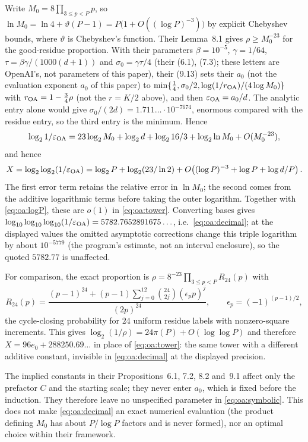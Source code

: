 Write $M_0=8\prod_{3\le p<P}p$, so
$\ln M_0=\ln4+\vartheta(P-1)=P\bigl(1+O((\log P)^{-3})\bigr)$ by
explicit Chebyshev bounds, where $\vartheta$ is Chebyshev's
function. Their Lemma~8.1 gives $\rho\ge M_0^{-23}$ for the
good-residue proportion. With their parameters
$\beta=10^{-5}$, $\gamma=1/64$,
$\tau=\beta\gamma/(1000(d+1))$ and $\sigma_0=\gamma\tau/4$
(their (6.1), (7.3); these letters are OpenAI's, not parameters
of this paper), their (9.13) sets their
$a_0$ (not the evaluation exponent $a_0$ of this paper) to
$\min\{\tfrac14,\sigma_0/2,\log(1/r_{\rm OA})/(4\log M_0)\}$
with $r_{\rm OA}=1-\tfrac34\rho$ (not the $r=K/2$ above), and
then $\varepsilon_{\mathrm{OA}}=a_0/d$. The
analytic entry alone would give
$\sigma_0/(2d)=1.711\ldots\cdot10^{-7674}$, enormous compared with
the residue entry, so the third entry is the minimum. Hence
\[
  \log_21/\varepsilon_{\mathrm{OA}}
   =23\log_2M_0+\log_2d+\log_216/3+\log_2\ln M_0
     +O(M_0^{-23}),
\]
and hence
\[
 X=\log_2\log_2(1/\varepsilon_{\mathrm{OA}})
 =\log_2P+\log_2(23/\ln2)
   +O\!\left((\log P)^{-3}+\log P+\log d/P\right).
\]
The first error term retains the relative error in $\ln M_0$;
the second comes from the additive logarithmic terms before taking
the outer logarithm. Together with \eqref{eq:oa:logP}, these are
$o(1)$ in \eqref{eq:oa:tower}. Converting bases gives
$\log_{10}\log_{10}\log_{10}(1/\varepsilon_{\mathrm{OA}})
=5782.7652891675\ldots$, i.e.\ \eqref{eq:oa:decimal}; at the
displayed values the omitted asymptotic corrections change this
triple logarithm by about $10^{-5779}$ (the program's estimate,
not an interval enclosure), so the quoted $5782.77$ is
unaffected.

For comparison, the exact proportion is
$\rho=8^{-23}\prod_{3\le p<P}R_{24}(p)$ with
\[
  R_{24}(p)=
  \frac{(p-1)^{24}+(p-1)\sum_{j=0}^{12}\binom{24}{2j}
        (\epsilon_pp)^j}{(2p)^{24}},
  \qquad\epsilon_p=(-1)^{(p-1)/2},
\]
the cycle-closing probability for $24$ uniform residue labels with
nonzero-square increments. This gives
$\log_2(1/\rho)=24\pi(P)+O(\log\log P)$ and therefore
$X=96e_0+288250.69\ldots$ in place of \eqref{eq:oa:tower}: the
same tower with a different additive constant, invisible in
\eqref{eq:oa:decimal} at the displayed precision.

The implied constants in their Propositions~6.1, 7.2, 8.2 and~9.1
affect only the prefactor $C$ and the starting scale; they never
enter $a_0$, which is fixed before the induction. They therefore
leave no unspecified parameter in \eqref{eq:oa:symbolic}. This
does not make \eqref{eq:oa:decimal} an exact numerical evaluation
(the product defining $M_0$ has about $P/\log P$ factors and is
never formed), nor an optimal choice within their framework.


